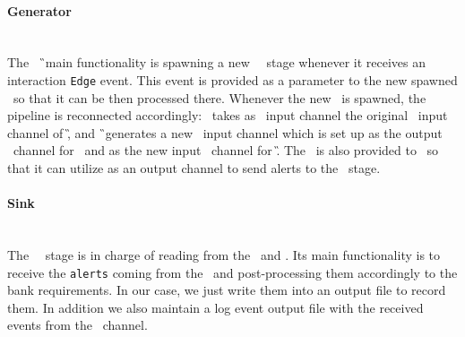 \paragraph*{Generator\\\\}

The \generator\ \G\ main functionality is spawning a new \filter\ \F\ stage whenever it receives an interaction \texttt{Edge} event. This event is provided as a parameter to the new spawned \F\ so that it can be then processed there. Whenever the new \F\ is spawned, the pipeline is reconnected accordingly: \F\ takes as \eventch\ input channel the original \eventch\ input channel of \G, and \G\ generates a new \eventch\ input channel which is set up as the output \eventch\ channel for \F\ and as the new input \eventch\ channel for \G. The \alertch\ is also provided to \F\ so that it can utilize as an output channel to send alerts to the \sink\ stage.

\paragraph*{Sink\\\\}

The \sink\ \Sk\ stage is in charge of reading from the \eventch\ and \alertch. Its main functionality is to receive the \texttt{alerts} coming from the \alertch\ and post-processing them accordingly to the bank requirements. In our case, we just write them into an output file to record them. In addition we also maintain a log event output file with the received events from the \eventch\ channel.
